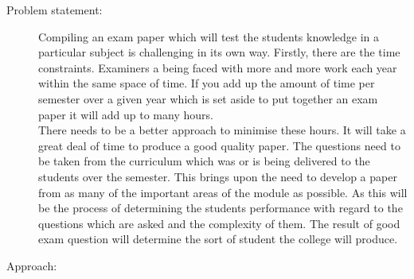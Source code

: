 \begin{description}
  \item[Problem statement:]

  \begin{comment}  
What problem are you trying to solve? What is the
scope of your work (a generalised approach, or for a specific situation)? Be careful not to use too
much jargon. In some cases it is appropriate to put the problem statement before the motivation,
but usually this only works if most readers already understand why the problem is important.
\end{comment}

Compiling an exam paper which will test the students knowledge in a particular subject is challenging in its own way. Firstly, there are the time constraints. Examiners a being faced with more and more work each year within the same space of time. If you add up the amount of time per semester over a given year which is set aside to put together an exam paper it will add up to many hours. \\There needs to be a better approach to minimise these hours. It will take a great deal of time to produce a good quality paper. The questions need to be taken from the curriculum which was or is being delivered to the students over the semester. This brings upon the need to develop a paper from as many of the important areas of the module as possible. As this will be the process of determining the students performance with regard to the questions which are asked and the complexity of them. The result of good exam question will determine the sort of student the college will produce.

  \item[Approach:]
  
    \begin{comment}
How did you go about solving or making progress on the problem? Did you use simulation,
analytic models, prototype construction, or analysis of field data for an actual product? What was
the extent of your work (did you look at one application program or a hundred programs in twenty
different programming languages?) What important variables did you control, ignore, or measure?
\end{comment}


\end{description}
